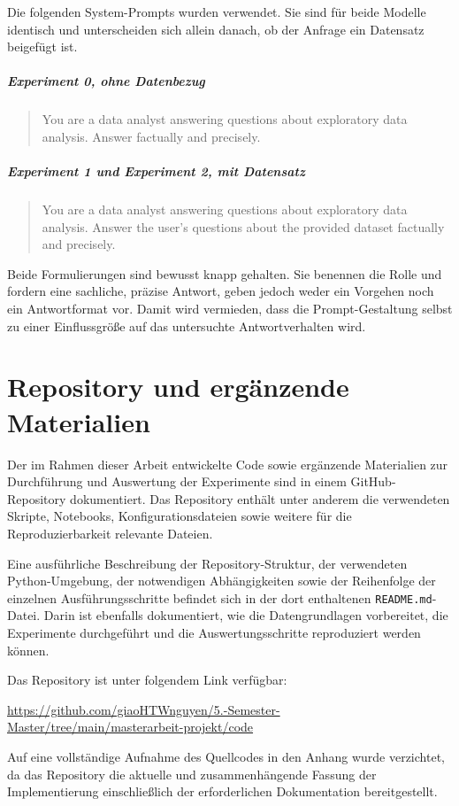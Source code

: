 Die folgenden System-Prompts wurden verwendet. Sie sind für beide Modelle
identisch und unterscheiden sich allein danach, ob der Anfrage ein Datensatz
beigefügt ist.

\paragraph{Experiment 0, ohne Datenbezug}

\begin{quote}
\ttfamily\small
You are a data analyst answering questions about exploratory data analysis.
Answer factually and precisely.
\end{quote}

\paragraph{Experiment 1 und Experiment 2, mit Datensatz}

\begin{quote}
\ttfamily\small
You are a data analyst answering questions about exploratory data analysis.
Answer the user's questions about the provided dataset factually and precisely.
\end{quote}

Beide Formulierungen sind bewusst knapp gehalten. Sie benennen die Rolle und
fordern eine sachliche, präzise Antwort, geben jedoch weder ein Vorgehen noch
ein Antwortformat vor. Damit wird vermieden, dass die Prompt-Gestaltung selbst
zu einer Einflussgröße auf das untersuchte Antwortverhalten wird.

\chapter{Repository und ergänzende Materialien}
\label{ch:Repository}

Der im Rahmen dieser Arbeit entwickelte Code sowie ergänzende Materialien zur Durchführung und Auswertung der Experimente sind in einem GitHub-Repository dokumentiert. Das Repository enthält unter anderem die verwendeten Skripte, Notebooks, Konfigurationsdateien sowie weitere für die Reproduzierbarkeit relevante Dateien.

Eine ausführliche Beschreibung der Repository-Struktur, der verwendeten \\ Python-Umgebung, der notwendigen Abhängigkeiten sowie der Reihenfolge der einzelnen Ausführungsschritte befindet sich in der dort enthaltenen \texttt{README.md}-Datei. Darin ist ebenfalls dokumentiert, wie die Datengrundlagen vorbereitet, die Experimente durchgeführt und die Auswertungsschritte reproduziert werden können.

Das Repository ist unter folgendem Link verfügbar:

\url{https://github.com/giaoHTWnguyen/5.-Semester-Master/tree/main/masterarbeit-projekt/code}

Auf eine vollständige Aufnahme des Quellcodes in den Anhang wurde verzichtet, da das Repository die aktuelle und zusammenhängende Fassung der Implementierung einschließlich der erforderlichen Dokumentation bereitgestellt.